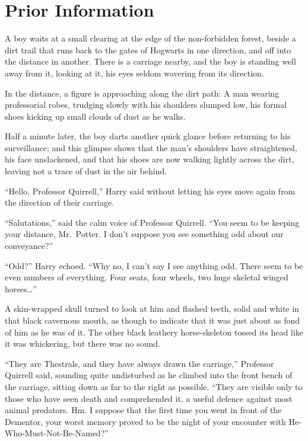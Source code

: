 \chapter{Prior Information}\label{prior-information}

A boy waits at a small clearing at the edge of the non-forbidden forest,
beside a dirt trail that runs back to the gates of Hogwarts in one
direction, and off into the distance in another. There is a carriage
nearby, and the boy is standing well away from it, looking at it, his
eyes seldom wavering from its direction.

In the distance, a figure is approaching along the dirt path: A man
wearing professorial robes, trudging slowly with his shoulders slumped
low, his formal shoes kicking up small clouds of dust as he walks.

Half a minute later, the boy darts another quick glance before returning
to his surveillance; and this glimpse shows that the man's shoulders
have straightened, his face unslackened, and that his shoes are now
walking lightly across the dirt, leaving not a trace of dust in the air
behind.

``Hello, Professor Quirrell,'' Harry said without letting his eyes move
again from the direction of their carriage.

``Salutations,'' said the calm voice of Professor Quirrell. ``You seem
to be keeping your distance, Mr.~Potter. I don't suppose you see
something odd about our conveyance?''

``Odd?'' Harry echoed. ``Why no, I can't say I see anything odd. There
seem to be even numbers of everything. Four seats, four wheels, two huge
skeletal winged horses\ldots{}''

A skin-wrapped skull turned to look at him and flashed teeth, solid and
white in that black cavernous mouth, as though to indicate that it was
just about as fond of him as he was of it. The other black leathery
horse-skeleton tossed its head like it was whickering, but there was no
sound.

``They are Thestrals, and they have always drawn the carriage,''
Professor Quirrell said, sounding quite undisturbed as he climbed into
the front bench of the carriage, sitting down as far to the right as
possible. ``They are visible only to those who have seen death and
comprehended it, a useful defence against most animal predators. Hm. I
suppose that the first time you went in front of the Dementor, your
worst memory proved to be the night of your encounter with
He-Who-Must-Not-Be-Named?''

